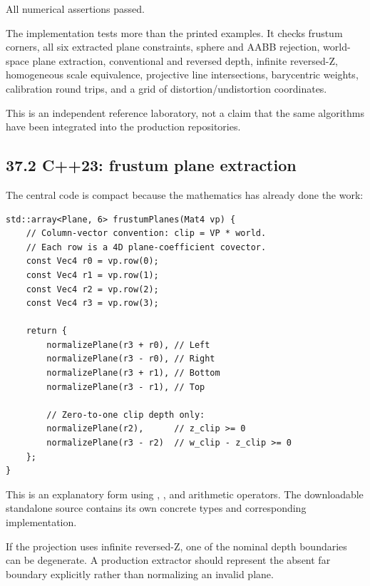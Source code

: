 All numerical assertions passed.

The implementation tests more than the printed examples. It checks frustum corners, all six extracted plane constraints, sphere and AABB rejection, world-space plane extraction, conventional and reversed depth, infinite reversed-Z, homogeneous scale equivalence, projective line intersections, barycentric weights, calibration round trips, and a grid of distortion/undistortion coordinates.

This is an independent reference laboratory, not a claim that the same algorithms have been integrated into the production repositories.

\subsection{37.2 C++23: frustum plane extraction}\label{02-foundations-ii-ch037-c23-frustum-plane-extraction}

\hypertarget{02-foundations-ii-ch037-c23-frustum-plane-extraction}{}

The central code is compact because the mathematics has already done the work:

\begin{verbatim}
std::array<Plane, 6> frustumPlanes(Mat4 vp) {
    // Column-vector convention: clip = VP * world.
    // Each row is a 4D plane-coefficient covector.
    const Vec4 r0 = vp.row(0);
    const Vec4 r1 = vp.row(1);
    const Vec4 r2 = vp.row(2);
    const Vec4 r3 = vp.row(3);

    return {
        normalizePlane(r3 + r0), // Left
        normalizePlane(r3 - r0), // Right
        normalizePlane(r3 + r1), // Bottom
        normalizePlane(r3 - r1), // Top

        // Zero-to-one clip depth only:
        normalizePlane(r2),      // z_clip >= 0
        normalizePlane(r3 - r2)  // w_clip - z_clip >= 0
    };
}
\end{verbatim}

This is an explanatory form using , , and arithmetic operators. The downloadable standalone source contains its own concrete types and corresponding implementation.

If the projection uses infinite reversed-Z, one of the nominal depth boundaries can be degenerate. A production extractor should represent the absent far boundary explicitly rather than normalizing an invalid plane.

